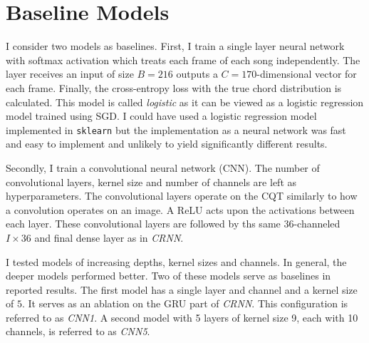 \section{Baseline Models}\label{sec:baselines}

I consider two models as baselines. First, I train a single layer neural network with softmax activation which treats each frame of each song independently. The layer receives an input of size $B=216$ outputs a $C=170$-dimensional vector for each frame. Finally, the cross-entropy loss with the true chord distribution is calculated. This model is called \emph{logistic} as it can be viewed as a logistic regression model trained using SGD. I could have used a logistic regression model implemented in \texttt{sklearn} but the implementation as a neural network was fast and easy to implement and unlikely to yield significantly different results.


Secondly, I train a convolutional neural network (CNN). The number of convolutional layers, kernel size and number of channels are left as hyperparameters. The convolutional layers operate on the CQT similarly to how a convolution operates on an image. A ReLU acts upon the activations between each layer. These convolutional layers are followed by ths same 36-channeled $I\times 36$ and final dense layer as in \emph{CRNN}. 

I tested models of increasing depths, kernel sizes and channels. In general, the deeper models performed better. Two of these models serve as baselines in reported results. The first model has a single layer and channel and a kernel size of $5$. It serves as an ablation on the GRU part of \emph{CRNN}. This configuration is referred to as \emph{CNN1}. A second model with 5 layers of kernel size 9, each with 10 channels, is referred to as \emph{CNN5}.

